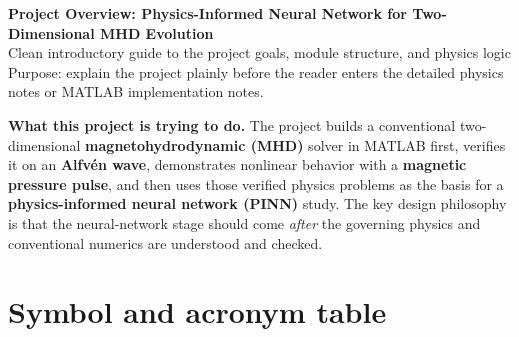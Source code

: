 \documentclass[11pt]{article}
\begin{document}
\begin{center}
    {\LARGE \bfseries \color{TitleBlue} Project Overview: Physics-Informed Neural Network for Two-Dimensional MHD Evolution}\\[0.5em]
    {\large \color{AccentTeal} Clean introductory guide to the project goals, module structure, and physics logic}\\[0.8em]
    {\normalsize Purpose: explain the project plainly before the reader enters the detailed physics notes or MATLAB implementation notes.}
\end{center}

\vspace{0.5em}

\begin{overviewbox}
\textbf{What this project is trying to do.} The project builds a conventional two-dimensional \textbf{magnetohydrodynamic (MHD)} solver in MATLAB first, verifies it on an \textbf{Alfv\'en wave}, demonstrates nonlinear behavior with a \textbf{magnetic pressure pulse}, and then uses those verified physics problems as the basis for a \textbf{physics-informed neural network (PINN)} study. The key design philosophy is that the neural-network stage should come \emph{after} the governing physics and conventional numerics are understood and checked.
\end{overviewbox}

\section{Symbol and acronym table}
\end{document}
